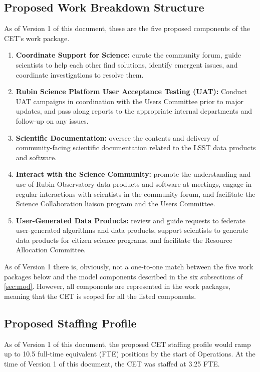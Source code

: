 \documentclass[DM,lsstdraft,toc]{lsstdoc}
\begin{document}
\subsection{Proposed Work Breakdown Structure}\label{ssec:comp_wbs}

As of Version 1 of this document, these are the five proposed components of the CET's work package.

\begin{enumerate}
\item \textbf{Coordinate Support for Science:} curate the community forum, guide scientists to help each other find solutions, identify emergent issues, and coordinate investigations to resolve them.
\item \textbf{Rubin Science Platform User Acceptance Testing (UAT):} Conduct UAT campaigns in coordination with the Users Committee prior to major updates, and pass along reports to the appropriate internal departments and follow-up on any issues.
\item \textbf{Scientific Documentation:} oversee the contents and delivery of community-facing scientific documentation related to the LSST data products and software. 
\item \textbf{Interact with the Science Community:} promote the understanding and use of Rubin Observatory data products and software at meetings, engage in regular interactions with scientists in the community forum, and facilitate the Science Collaboration liaison program and the Users Committee.
\item \textbf{User-Generated Data Products:} review and guide requests to federate user-generated algorithms and data products, support scientists to generate data products for citizen science programs, and facilitate the Resource Allocation Committee.
\end{enumerate}

As of Version 1 there is, obviously, not a one-to-one match between the five work packages below and the model components described in the six subsections of \ref{sec:mod}.
However, all components are represented in the work packages, meaning that the CET is scoped for all the listed components.

\subsection{Proposed Staffing Profile}\label{comp_staff}

As of Version 1 of this document, the proposed CET staffing profile would ramp up to 10.5 full-time equivalent (FTE) positions by the start of Operations.
At the time of Version 1 of this document, the CET was staffed at 3.25 FTE.
\end{document}
